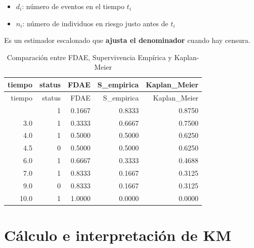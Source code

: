 \documentclass[
]{article}
\providecommand{\tightlist}{%
  \setlength{\itemsep}{0pt}\setlength{\parskip}{0pt}}
\begin{document}
\begin{itemize}
\tightlist
\item
  \(d_i\): número de eventos en el tiempo \(t_i\)
\item
  \(n_i\): número de individuos en riesgo justo antes de \(t_i\)
\end{itemize}

Es un estimador escalonado que \textbf{ajusta el denominador} cuando hay
censura.

\begin{tcolorbox}[enhanced jigsaw, titlerule=0mm, colback=white, arc=.35mm, toprule=.15mm, breakable, coltitle=black, bottomrule=.15mm, left=2mm, title=\textcolor{quarto-callout-note-color}{\faInfo}\hspace{0.5em}{Ejemplo}, colbacktitle=quarto-callout-note-color!10!white, bottomtitle=1mm, toptitle=1mm, opacitybacktitle=0.6, colframe=quarto-callout-note-color-frame, rightrule=.15mm, leftrule=.75mm, opacityback=0]

\begin{longtable}[]{@{}rrrrr@{}}
\caption{Comparación entre FDAE, Supervivencia Empírica y
Kaplan-Meier}\tabularnewline
\toprule\noalign{}
tiempo & status & FDAE & S\_empirica & Kaplan\_Meier \\
\midrule\noalign{}
\endfirsthead
\toprule\noalign{}
tiempo & status & FDAE & S\_empirica & Kaplan\_Meier \\
\midrule\noalign{}
\endhead
\bottomrule\noalign{}
\endlastfoot
2.0 & 1 & 0.1667 & 0.8333 & 0.8750 \\
3.0 & 1 & 0.3333 & 0.6667 & 0.7500 \\
4.0 & 1 & 0.5000 & 0.5000 & 0.6250 \\
4.5 & 0 & 0.5000 & 0.5000 & 0.6250 \\
6.0 & 1 & 0.6667 & 0.3333 & 0.4688 \\
7.0 & 1 & 0.8333 & 0.1667 & 0.3125 \\
9.0 & 0 & 0.8333 & 0.1667 & 0.3125 \\
10.0 & 1 & 1.0000 & 0.0000 & 0.0000 \\
\end{longtable}

\end{tcolorbox}

\section{Cálculo e interpretación de
KM}\label{cuxe1lculo-e-interpretaciuxf3n-de-km}
\end{document}
